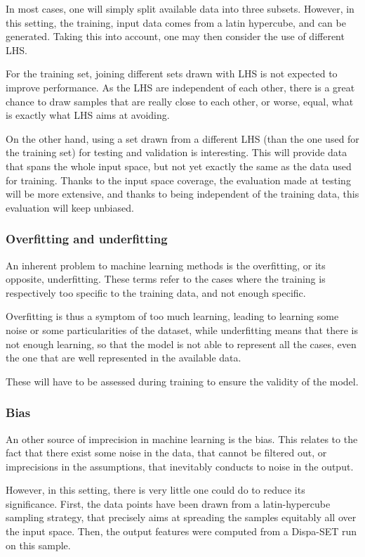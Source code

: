 In most cases, one will simply split available data into three subsets. However, in this setting, the training, input data comes from a latin hypercube, and can be generated. Taking this into account, one may then consider the use of different LHS.

For the training set, joining different sets drawn with LHS is not expected to improve performance. As the LHS are independent of each other, there is a great chance to draw samples that are really close to each other, or worse, equal, what is exactly what LHS aims at avoiding.

On the other hand, using a set drawn from a different LHS (than the one used for the training set) for testing and validation is interesting. This will provide data that spans the whole input space, but not yet exactly the same as the data used for training. Thanks to the input space coverage, the evaluation made at testing will be more extensive, and thanks to being independent of the training data, this evaluation will keep unbiased.

\subsubsection{Overfitting and underfitting}

An inherent problem to machine learning methods is the overfitting, or its opposite, underfitting. These terms refer to the cases where the training is respectively too specific to the training data, and not enough specific.

Overfitting is thus a symptom of too much learning, leading to learning some noise or some particularities of the dataset, while underfitting means that there is not enough learning, so that the model is not able to represent all the cases, even the one that are well represented in the available data.

These will have to be assessed during training to ensure the validity of the model.

\subsubsection{Bias\label{ssec:bias}}

An other source of imprecision in machine learning is the bias. This relates to the fact that there exist some noise in the data, that cannot be filtered out, or imprecisions in the assumptions, that inevitably conducts to noise in the output.

However, in this setting, there is very little one could do to reduce its significance. First, the data points have been drawn from a latin-hypercube sampling strategy, that precisely aims at spreading the samples equitably all over the input space. Then, the output features were computed from a Dispa-SET run on this sample.

